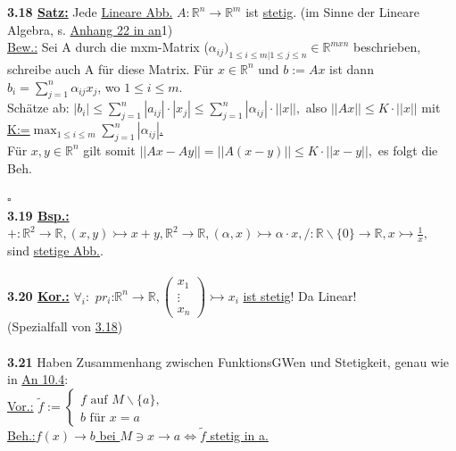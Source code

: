 \documentclass[]{scrartcl}
\begin{document}
	\textbf{3.18 \underline{Satz:}} Jede  \ul{Lineare Abb.} 
	$A:\mathbb{R}^n\rightarrow\mathbb{R}^m$ ist \ul{stetig}. (im Sinne der 
	Lineare Algebra, s. \ul{Anhang 22 in an}1)\\
	\underline{Bew.:} Sei A durch die mxm-Matrix ($\alpha_{ij})_{1\leq i\leq 
	m|1\leq j\leq n}\in\mathbb{R}^{mxn}$ beschrieben, schreibe auch A für diese 
	Matrix. Für $x \in \mathbb{R}^n$ und $b:=Ax$ ist dann 
	$b_i=\sum_{j=1}^{n}\alpha_{ij}x_j$, wo $1\leq i \leq m$.\\
	Schätze ab: \ul{$|b_i|\leq 
	\sum_{j=1}^{n}|a_{ij}|\cdot|x_j|\leq 
	\sum_{j=1}^{n}|\alpha_{ij}|\cdot||x||,$} also \ul{$||Ax||\leq K\cdot||x||$}
	mit \ul{K:=$\max_{1\leq i\leq m}\sum_{j=1}^{n}|\alpha_{ij}|$.}\\
	Für $x,y\in\mathbb{R}^n$ gilt somit $||Ax-Ay||=||A(x-y)||\leq K\cdot 
	||x-y||,$ es folgt die Beh.\\
	\strut\hfill$\square$\\
	\textbf{3.19 \underline{Bsp.:}} $+:\mathbb{R}^2\rightarrow\mathbb{R}, 
	(x,y)\rightarrowtail x+y, \mathbb{R}^2\rightarrow\mathbb{R}, 
	(\alpha,x)\rightarrowtail \alpha\cdot x, 
	/:\mathbb{R}\backslash\{0\}\rightarrow\mathbb{R}, 
	x\rightarrowtail\frac{1}{x},$\\
	sind \ul{stetige Abb.}.\\
	\\
	\textbf{3.20 \underline{Kor.:}} $\forall_i:$ 
	\ul{$pr_i$}:$\mathbb{R}^n\rightarrow\mathbb{R},\begin{pmatrix}
		x_1\\ \vdots\\x_n
	\end{pmatrix}\rightarrowtail x_i$ \ul{ist stetig}! Da Linear!\\
	(Spezialfall von  \ul{3.18})\\
	\\
	\textbf{3.21} Haben Zusammenhang zwischen FunktionsGWen und Stetigkeit, 
	genau wie in \ul{An 10.4}:\\
	\underline{Vor.:} \ul{$\tilde{f}$}$:=\begin{cases}
			f \text{ auf } M\backslash \{a\},\\
			b \text{ für } x=a
	\end{cases}$\\
\underline{Beh.:}\ul{$f(x)\rightarrow b$ bei $M\ni x\rightarrow a 
\Leftrightarrow \tilde{f}$ stetig in a.}\\
\end{document}
